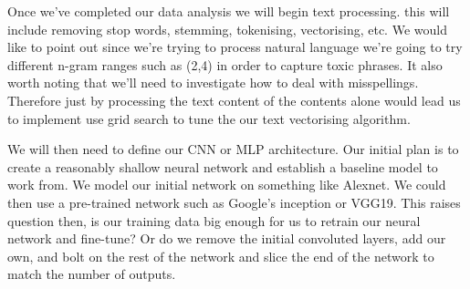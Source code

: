 Once we've completed our data analysis we will begin text processing.
this will include removing stop words, stemming, tokenising,
vectorising, etc. We would like to point out since we're trying to
process natural language we're going to try different n-gram ranges such
as (2,4) in order to capture toxic phrases. It also worth noting that
we'll need to investigate how to deal with misspellings. Therefore just
by processing the text content of the contents alone would lead us to
implement use grid search to tune the our text vectorising algorithm.

We will then need to define our CNN or MLP architecture. Our initial
plan is to create a reasonably shallow neural network and establish a
baseline model to work from. We model our initial network on something
like Alexnet. We could then use a pre-trained network such as Google's
inception or VGG19. This raises question then, is our training data big
enough for us to retrain our neural network and fine-tune? Or do we
remove the initial convoluted layers, add our own, and bolt on the rest
of the network and slice the end of the network to match the number of
outputs.

